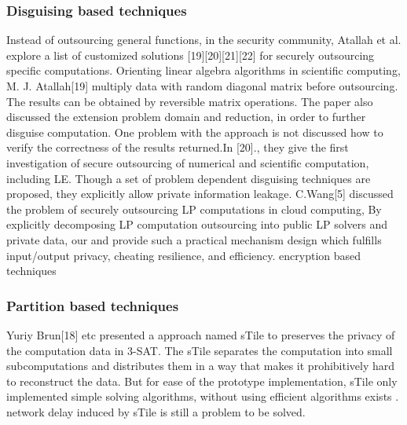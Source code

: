 \documentclass[runningheads,a4paper]{llncs}
\begin{document}
\subsubsection{Disguising based techniques}
Instead of outsourcing general functions, in the security community, Atallah et al. explore a list of customized solutions [19][20][21][22] for securely outsourcing specific computations. Orienting linear algebra algorithms in scientific computing, M. J. Atallah[19] multiply data with random diagonal matrix before outsourcing. The results can be obtained by reversible matrix operations. The paper also discussed the extension problem domain and reduction, in order to further disguise computation. One problem with the approach is not discussed how to verify the correctness of the results returned.In [20]., they give the first investigation of secure outsourcing of numerical and scientific computation, including LE. Though a set of problem dependent disguising techniques are proposed, they explicitly allow private information leakage.
C.Wang[5] discussed the problem of securely outsourcing LP computations in cloud computing, By explicitly decomposing LP computation outsourcing into public LP solvers and private data, our 
and provide such a practical mechanism design which fulfills input/output privacy, cheating resilience, and efficiency.
encryption based techniques
\subsubsection{Partition based techniques}
Yuriy Brun[18] etc presented a approach named sTile to preserves the privacy of the computation data in 3-SAT. The sTile separates the computation into small subcomputations and distributes them in a way that makes it prohibitively hard to reconstruct the data. But for ease of the prototype implementation, sTile only implemented simple solving algorithms, without using efficient algorithms exists . network delay induced by sTile is still a problem to be solved.
\end{document}
